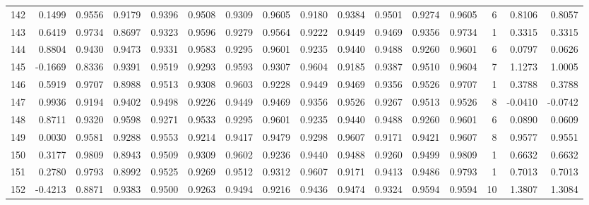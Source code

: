 \begin{tabular}{lrrrrrrrrrrrrrrr}
142 &      0.1499 &  0.9556 &  0.9179 &  0.9396 &  0.9508 &  0.9309 &  0.9605 &  0.9180 &  0.9384 &  0.9501 &   0.9274 &     0.9605 &      6 &                    0.8106 &                     0.8057 \\
143 &      0.6419 &  0.9734 &  0.8697 &  0.9323 &  0.9596 &  0.9279 &  0.9564 &  0.9222 &  0.9449 &  0.9469 &   0.9356 &     0.9734 &      1 &                    0.3315 &                     0.3315 \\
144 &      0.8804 &  0.9430 &  0.9473 &  0.9331 &  0.9583 &  0.9295 &  0.9601 &  0.9235 &  0.9440 &  0.9488 &   0.9260 &     0.9601 &      6 &                    0.0797 &                     0.0626 \\
145 &     -0.1669 &  0.8336 &  0.9391 &  0.9519 &  0.9293 &  0.9593 &  0.9307 &  0.9604 &  0.9185 &  0.9387 &   0.9510 &     0.9604 &      7 &                    1.1273 &                     1.0005 \\
146 &      0.5919 &  0.9707 &  0.8988 &  0.9513 &  0.9308 &  0.9603 &  0.9228 &  0.9449 &  0.9469 &  0.9356 &   0.9526 &     0.9707 &      1 &                    0.3788 &                     0.3788 \\
147 &      0.9936 &  0.9194 &  0.9402 &  0.9498 &  0.9226 &  0.9449 &  0.9469 &  0.9356 &  0.9526 &  0.9267 &   0.9513 &     0.9526 &      8 &                   -0.0410 &                    -0.0742 \\
148 &      0.8711 &  0.9320 &  0.9598 &  0.9271 &  0.9533 &  0.9295 &  0.9601 &  0.9235 &  0.9440 &  0.9488 &   0.9260 &     0.9601 &      6 &                    0.0890 &                     0.0609 \\
149 &      0.0030 &  0.9581 &  0.9288 &  0.9553 &  0.9214 &  0.9417 &  0.9479 &  0.9298 &  0.9607 &  0.9171 &   0.9421 &     0.9607 &      8 &                    0.9577 &                     0.9551 \\
150 &      0.3177 &  0.9809 &  0.8943 &  0.9509 &  0.9309 &  0.9602 &  0.9236 &  0.9440 &  0.9488 &  0.9260 &   0.9499 &     0.9809 &      1 &                    0.6632 &                     0.6632 \\
151 &      0.2780 &  0.9793 &  0.8992 &  0.9525 &  0.9269 &  0.9512 &  0.9312 &  0.9607 &  0.9171 &  0.9413 &   0.9486 &     0.9793 &      1 &                    0.7013 &                     0.7013 \\
152 &     -0.4213 &  0.8871 &  0.9383 &  0.9500 &  0.9263 &  0.9494 &  0.9216 &  0.9436 &  0.9474 &  0.9324 &   0.9594 &     0.9594 &     10 &                    1.3807 &                     1.3084 \\

\end{tabular}
